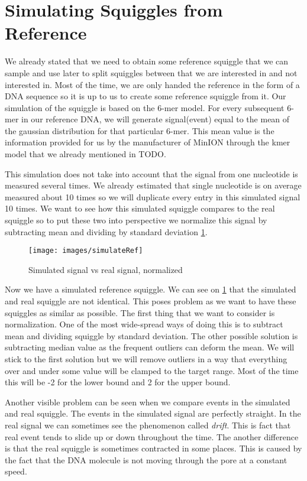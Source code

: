 \section{Simulating Squiggles from Reference}

We already stated that we need to obtain some reference squiggle that we
can sample and use later to split squiggles between that we are interested in and not
interested in. Most of the time, we are only handed the reference in the form of a DNA sequence
so it is up to us to create some reference squiggle from it. Our simulation of the squiggle is based on the 6-mer model.
For every subsequent 6-mer in our reference DNA, we will generate signal(event) equal to
the mean of the gaussian distribution for that particular 6-mer. This mean value
is the information provided for us by the manufacturer of MinION through the kmer model
that we already mentioned in TODO.

This simulation does not take into account that the signal from one nucleotide is
measured several times. We already estimated that single nucleotide is on average
measured about 10 times so we will duplicate every entry in this simulated signal
10 times. We want to see how this simulated squiggle compares to the real squiggle
so to put these two into perspective we normalize this signal by subtracting mean
and dividing by standard deviation \ref{obr:simVsReal}.

\begin{figure}
\centerline{\texttt{[image: images/simulateRef]}}
\caption[TODO]{Simulated signal vs real signal, normalized}
\label{obr:simVsReal}
\end{figure}

Now we have a simulated reference squiggle. We can see on \ref{obr:simVsReal} that the simulated and real
squiggle are not identical. This poses problem as we want to have these squiggles as
similar as possible. The first thing that we want to consider is normalization.
One of the most wide-spread ways of doing this is to subtract mean and dividing
squiggle by standard deviation. The other possible solution is subtracting median value
as the frequent outliers can deform the mean. We will stick to the first solution
but we will remove outliers in a way that everything over and under some value will
be clamped to the target range. Most of the time this will be -2 for the lower bound
and 2 for the upper bound.

Another visible problem can be seen when we compare events in the simulated and real squiggle.
The events in the simulated signal are perfectly straight. In the real signal we can sometimes see
the phenomenon called \textit{drift}. This is fact that real event tends to slide
up or down throughout the time. The another difference is that the real squiggle
is sometimes contracted in some places. This is caused by the fact that the DNA
molecule is not moving through the pore at a constant speed.


